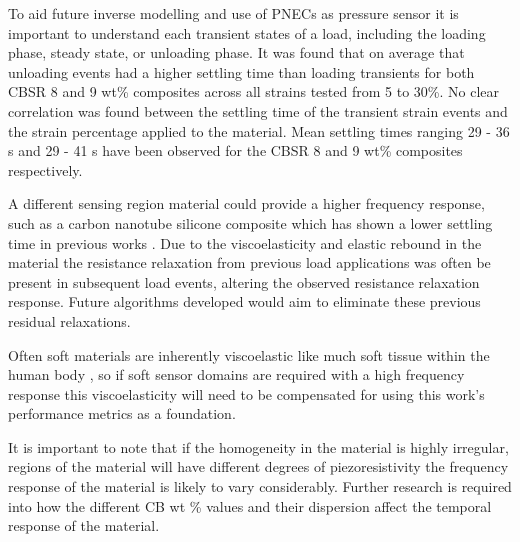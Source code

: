 To aid future inverse modelling and use of PNECs as pressure sensor it is important to understand each transient states of a load, including the loading phase, steady state, or unloading phase. It was found that on average that unloading events had a higher settling time than loading transients for both CBSR 8 and 9 wt\% composites across all strains tested from 5 to 30\%. No clear correlation was found between the settling time of the transient strain events and the strain percentage applied to the material. Mean settling times ranging 29 - 36 s and 29 - 41 s have been observed for the CBSR 8 and 9 wt\% composites respectively. 


A different sensing region material could provide a higher frequency response, such as a carbon nanotube silicone composite which has shown a lower settling time in previous works \citep{Zhao2013,Vidhate2010}. Due to the viscoelasticity and elastic rebound in the material the resistance relaxation from previous load applications was often be present in subsequent load events, altering the observed resistance relaxation response. Future algorithms developed would aim to eliminate these previous residual relaxations. 

Often soft materials are inherently viscoelastic like much soft tissue within the human body \citep{Landry2021}, so if soft sensor domains are required with a high frequency response this viscoelasticity will need to be compensated for using this work's performance metrics as a foundation.  

It is important to note that if the homogeneity in the material is highly irregular, regions of the material will have different degrees of piezoresistivity the frequency response of the material is likely to vary considerably. Further research is required into how the different CB wt \% values and their dispersion affect the temporal response of the material.


